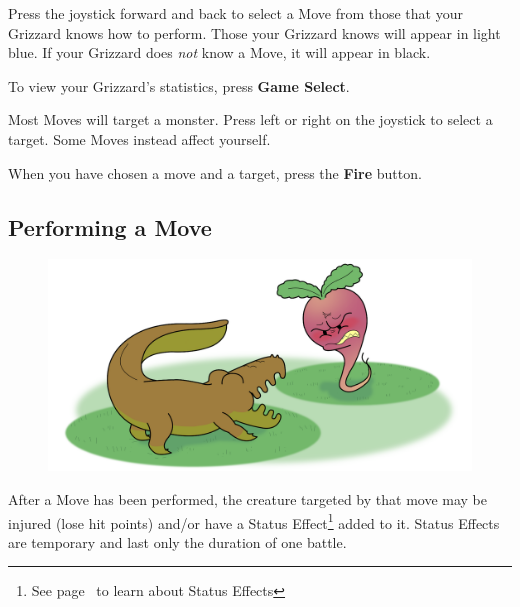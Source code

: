 \documentclass[10pt,twocolumn,openany,article]{memoir}
\begin{document}
Press the  joystick forward and  back to select  a Move from  those that
your  Grizzard knows  how to  perform.  Those your  Grizzard knows  will
appear in light  blue. If your Grizzard does \emph{not}  know a Move, it
will appear in black.

To view your Grizzard's statistics, press \textbf{Game Select}.

Most Moves will target a monster. Press left or right on the joystick to
select a target. Some Moves instead affect yourself.

When   you   have   chosen   a    move   and   a   target,   press   the
\textbf{Fire} button.


\subsection{Performing a Move}

\begin{figure}[b]
  \begin{center}
    \includegraphics[width=2\columnwidth,height=\columnwidth]{../Manual/GrizzardCombat.png}
  \end{center}
\end{figure}

After a Move has been performed,  the creature targeted by that move may
be injured  (lose hit points)  and/or have a  Status Effect\footnote{See
  page~\pageref{sec:StatusEffects} to learn  about Status Effects} added
to  it. Status  Effects  are temporary  and last  only  the duration  of
one battle.
\end{document}
